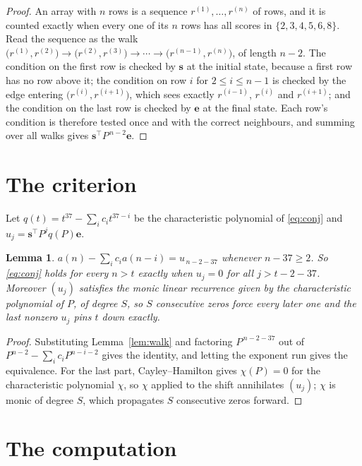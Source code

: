 \documentclass[11pt,a4paper]{article}
\theoremstyle{plain}
\newtheorem{lemma}[theorem]{Lemma}
\theoremstyle{definition}
\begin{document}
\begin{proof}
An array with $n$ rows is a sequence $r^{(1)},\dots,r^{(n)}$ of rows, and it is counted
exactly when every one of its $n$ rows has all scores in $\{2,3,4,5,6,8\}$. Read the sequence as the
walk $\bigl(r^{(1)},r^{(2)}\bigr)\to\bigl(r^{(2)},r^{(3)}\bigr)\to\cdots\to
\bigl(r^{(n-1)},r^{(n)}\bigr)$, of length $n-2$. The condition on the first row is
checked by $\mathbf{s}$ at the initial state, because a first row has no row above it; the
condition on row $i$ for $2\le i\le n-1$ is checked by the edge entering
$\bigl(r^{(i)},r^{(i+1)}\bigr)$, which sees exactly $r^{(i-1)}$, $r^{(i)}$ and
$r^{(i+1)}$; and the condition on the last row is checked by $\mathbf{e}$ at the final
state. Each row's condition is therefore tested once and with the correct neighbours, and
summing over all walks gives $\mathbf{s}^{\!\top}P^{\,n-2}\mathbf{e}$.
\end{proof}

\section{The criterion}

Let $q(t)=t^{37}-\sum_i c_i t^{37-i}$ be the characteristic polynomial of
\eqref{eq:conj} and $u_j=\mathbf{s}^{\!\top}P^{j}q(P)\mathbf{e}$.

\begin{lemma}\label{lem:crit}
$a(n)-\sum_i c_i a(n-i)=u_{\,n-2-37}$ whenever $n-37\ge2$. So \eqref{eq:conj}
holds for every $n>t$ exactly when $u_j=0$ for all $j>t-2-37$. Moreover $(u_j)$
satisfies the monic linear recurrence given by the characteristic polynomial of $P$, of
degree $S$, so $S$ consecutive zeros force every later one and the last nonzero $u_j$ pins
$t$ down exactly.
\end{lemma}

\begin{proof}
Substituting Lemma~\ref{lem:walk} and factoring $P^{\,n-2-37}$ out of
$P^{n-2}-\sum_i c_i P^{n-i-2}$ gives the identity, and letting the exponent run gives the
equivalence. For the last part, Cayley--Hamilton gives $\chi(P)=0$ for the characteristic
polynomial $\chi$, so $\chi$ applied to the shift annihilates $(u_j)$; $\chi$ is monic of
degree $S$, which propagates $S$ consecutive zeros forward.
\end{proof}

\section{The computation}
\end{document}
